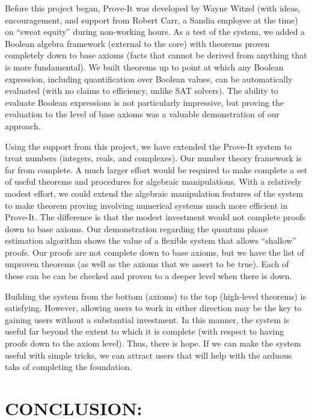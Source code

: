 \documentclass{article}[12pt]
\begin{document}
Before this project began, Prove-It was developed by Wayne Witzel (with ideas, encouragement, and support from Robert Carr, a Sandia employee at the time) on ``sweat equity'' during non-working hours.  As a test of the system, we added a Boolean algebra framework (external to the core) with theorems proven completely down to base axioms (facts that cannot be derived from anything that is more fundamental).  We built theorems up to point at which any Boolean expression, including quantification over Boolean values, can be automatically evaluated (with no claims to efficiency, unlike SAT solvers).  The ability to evaluate Boolean expressions is not particularly impressive, but proving the evaluation to the level of base axioms was a valuable demonstration of our approach.

Using the support from this project, we have extended the Prove-It system to treat numbers (integers, reals, and complexes).  Our number theory framework is far from complete.  A much larger effort would be required to make complete a set of useful theorems and procedures for algebraic manipulations.  With a relatively modest effort, we could extend the algebraic manipulation features of the system to make theorem proving involving numerical systems much more efficient in Prove-It.  The difference is that the modest investment would not complete proofs down to base axioms.  Our demonstration regarding the quantum phase estimation algorithm shows the value of a flexible system that allows ``shallow'' proofs.  Our proofs are not complete down to base axioms, but we have the list of unproven theorems (as well as the axioms that we assert to be true).  Each of these can be can be checked and proven to a deeper level when there is down.

Building the system from the bottom (axioms) to the top (high-level theorems) is satisfying.  However, allowing users to work in either direction may be the key to gaining users without a substantial investment.  In this manner, the system is useful far beyond the extent to which it is complete (with respect to having proofs down to the axiom level).  Thus, there is hope.  If we can make the system useful with simple tricks, we can attract users that will help with the arduous taks of completing the foundation.

\section*{CONCLUSION:}
\end{document}
